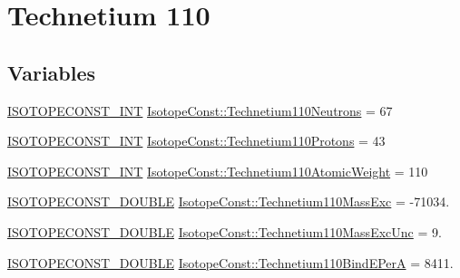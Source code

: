 \hypertarget{group___isotope_const-_technetium-_tc110}{}\section{Technetium 110}
\label{group___isotope_const-_technetium-_tc110}
\subsection*{Variables}
\begin{DoxyCompactItemize}
\item 
\mbox{\hyperlink{group___isotope_const-_macros_ga5f18360b3e99483a35c32d789e62621c}{I\+S\+O\+T\+O\+P\+E\+C\+O\+N\+S\+T\+\_\+\+I\+NT}} \mbox{\hyperlink{group___isotope_const-_technetium-_tc110_gae9afd921b5a06b902cc144e697ade46e}{Isotope\+Const\+::\+Technetium110\+Neutrons}} = 67
\item 
\mbox{\hyperlink{group___isotope_const-_macros_ga5f18360b3e99483a35c32d789e62621c}{I\+S\+O\+T\+O\+P\+E\+C\+O\+N\+S\+T\+\_\+\+I\+NT}} \mbox{\hyperlink{group___isotope_const-_technetium-_tc110_ga1c663d5ef56af6b67f6ce6a025a51c0d}{Isotope\+Const\+::\+Technetium110\+Protons}} = 43
\item 
\mbox{\hyperlink{group___isotope_const-_macros_ga5f18360b3e99483a35c32d789e62621c}{I\+S\+O\+T\+O\+P\+E\+C\+O\+N\+S\+T\+\_\+\+I\+NT}} \mbox{\hyperlink{group___isotope_const-_technetium-_tc110_gabfdb3de86be8f04d4f440d082da07cd5}{Isotope\+Const\+::\+Technetium110\+Atomic\+Weight}} = 110
\item 
\mbox{\hyperlink{group___isotope_const-_macros_ga8f45a7272ce02c0b4c65c44636ed719a}{I\+S\+O\+T\+O\+P\+E\+C\+O\+N\+S\+T\+\_\+\+D\+O\+U\+B\+LE}} \mbox{\hyperlink{group___isotope_const-_technetium-_tc110_ga88f9d6eac6678170f3944e8edd359d17}{Isotope\+Const\+::\+Technetium110\+Mass\+Exc}} = -\/71034.
\item 
\mbox{\hyperlink{group___isotope_const-_macros_ga8f45a7272ce02c0b4c65c44636ed719a}{I\+S\+O\+T\+O\+P\+E\+C\+O\+N\+S\+T\+\_\+\+D\+O\+U\+B\+LE}} \mbox{\hyperlink{group___isotope_const-_technetium-_tc110_ga17330cf34c0cb2adec5dbb8d467206f0}{Isotope\+Const\+::\+Technetium110\+Mass\+Exc\+Unc}} = 9.
\item 
\mbox{\hyperlink{group___isotope_const-_macros_ga8f45a7272ce02c0b4c65c44636ed719a}{I\+S\+O\+T\+O\+P\+E\+C\+O\+N\+S\+T\+\_\+\+D\+O\+U\+B\+LE}} \mbox{\hyperlink{group___isotope_const-_technetium-_tc110_ga64a4a6bf49068814cdc8bb3e42360310}{Isotope\+Const\+::\+Technetium110\+Bind\+E\+PerA}} = 8411.
\item 

\end{DoxyCompactItemize}
